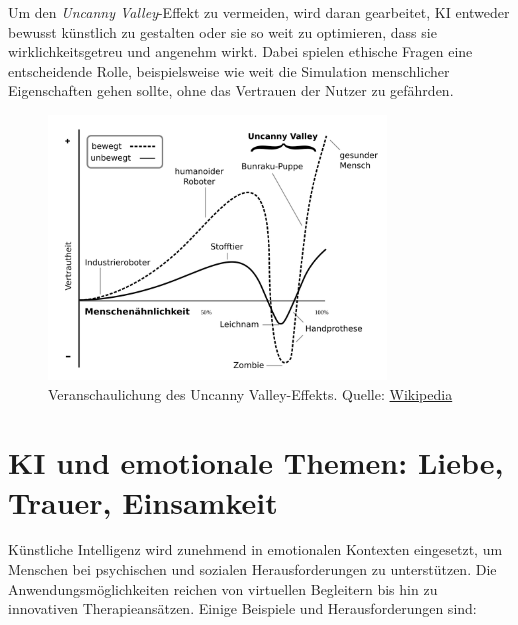 \documentclass[a4paper,12pt]{article}
\begin{document}
Um den \textit{Uncanny Valley}-Effekt zu vermeiden, wird daran gearbeitet, KI entweder bewusst künstlich zu gestalten oder sie so weit zu optimieren, dass sie wirklichkeitsgetreu und angenehm wirkt. Dabei spielen ethische Fragen eine entscheidende Rolle, beispielsweise wie weit die Simulation menschlicher Eigenschaften gehen sollte, ohne das Vertrauen der Nutzer zu gefährden.

\begin{figure}[h]
    \centering
    \includegraphics[width=0.8\textwidth]{image-2.png}
    \caption{Veranschaulichung des Uncanny Valley-Effekts.
    Quelle: \href{https://de.wikipedia.org}{Wikipedia}}
    \label{fig:example2}
\end{figure}

\section{KI und emotionale Themen: Liebe, Trauer, Einsamkeit}

Künstliche Intelligenz wird zunehmend in emotionalen Kontexten eingesetzt, um Menschen bei psychischen und sozialen Herausforderungen zu unterstützen. Die Anwendungsmöglichkeiten reichen von virtuellen Begleitern bis hin zu innovativen Therapieansätzen. Einige Beispiele und Herausforderungen sind:
\end{document}
